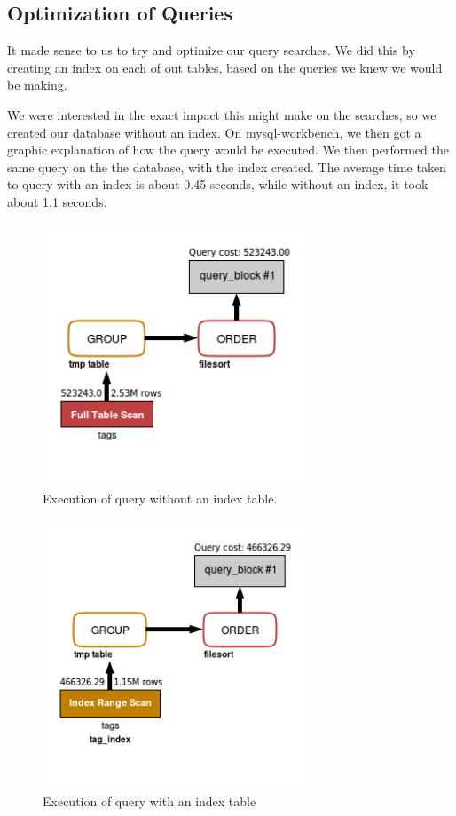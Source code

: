 \documentclass{article}
\begin{document}
\subsection{Optimization of Queries}
It made sense to us to try and optimize our query searches.  We did this by
creating an index on each of out tables, based on the queries we knew we
would be making.

We were interested in the exact impact this might make on the searches, so
we created our database without an index.  On mysql-workbench, we then got
a graphic explanation of how the query would be executed. We then performed
the same query on the the database, with the index created.
The average time taken to query with an index is about 0.45 seconds, while
without an index, it took about 1.1 seconds.

\begin{figure}[h]
	\includegraphics[width=8cm]{Query_eco_code_no_index}
	\caption{Execution of query without an index table.}
	\label{figure:2}
\end{figure}

\begin{figure}[h]
	\includegraphics[width=8cm]{Query_eco_code_w_index}
	\caption{Execution of query with an index table}
	\label{figure:3}
\end{figure}
\end{document}
